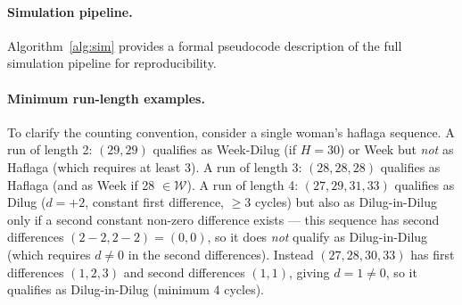 \documentclass[12pt]{article}
\begin{document}
\paragraph{Simulation pipeline.}
Algorithm~\ref{alg:sim} provides a formal pseudocode description of the full
simulation pipeline for reproducibility.

\paragraph{Minimum run-length examples.}
To clarify the counting convention, consider a single woman's haflaga sequence.
A run of length 2: $(29, 29)$ qualifies as Week-Dilug (if $H = 30$) or Week but
\emph{not} as Haflaga (which requires at least 3). A run of length 3: $(28, 28, 28)$
qualifies as Haflaga (and as Week if 28 $\in \mathcal{W}$). A run of length 4:
$(27, 29, 31, 33)$ qualifies as Dilug ($d = +2$, constant first difference, $\geq 3$ cycles)
but also as Dilug-in-Dilug only if a second constant non-zero difference exists ---
this sequence has second differences $(2-2, 2-2) = (0, 0)$, so it does \emph{not}
qualify as Dilug-in-Dilug (which requires $d \neq 0$ in the second differences).
Instead $(27, 28, 30, 33)$ has first differences $(1, 2, 3)$ and second differences
$(1, 1)$, giving $d = 1 \neq 0$, so it qualifies as Dilug-in-Dilug (minimum 4 cycles).
\end{document}
